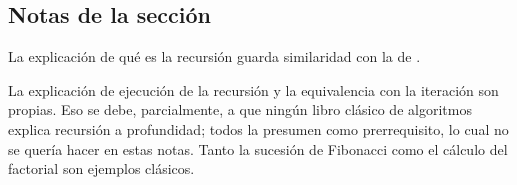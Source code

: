 \subsection*{Notas de la sección}

La explicación de qué es la recursión guarda similaridad con la de \cite{leetcode_recursion}. 

La explicación de ejecución de la recursión y la equivalencia con la iteración son propias. Eso se debe, parcialmente, a que ningún libro clásico de algoritmos explica recursión a profundidad; todos la presumen como prerrequisito, lo cual no se quería hacer en estas notas. Tanto la sucesión de Fibonacci como el cálculo del factorial son ejemplos clásicos.
